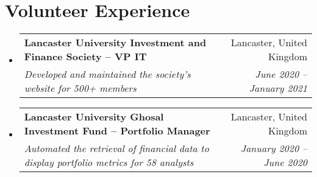 \documentclass[a4paper,20pt]{article}
\makeatletter
\newcommand{\resumeSubheading}[4]{
  \vspace{-1pt}\item
    \begin{tabular*}{0.97\textwidth}{l@{\extracolsep{\fill}}r}
      \textbf{#1} & #2 \\
      \textit{#3} & \textit{#4} \\
    \end{tabular*}\vspace{-5pt}
}
\newcommand{\resumeSubHeadingListStart}{\begin{itemize}[leftmargin=*]}
\newcommand{\resumeSubHeadingListEnd}{\end{itemize}}
\makeatother
\begin{document}
\vspace{-5pt}
\section{Volunteer Experience}
  \resumeSubHeadingListStart
    \resumeSubheading
    {Lancaster University Investment and Finance Society – VP IT}{Lancaster, United Kingdom}
    {Developed and maintained the society's website for 500+ members}{June 2020 – January 2021}
\vspace{5pt}
    \resumeSubheading
    {Lancaster University Ghosal Investment Fund – Portfolio Manager}{Lancaster, United Kingdom}
    {Automated the retrieval of financial data to display portfolio metrics for 58 analysts}{January 2020 – June 2020}

\resumeSubHeadingListEnd
\end{document}
